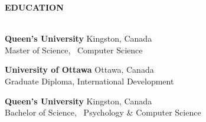 \documentclass[letterpaper]{article}
\newcommand{\lineunder} {
        \vspace*{-8pt} \\
        \hspace*{-18pt} \hrulefill \\
    }
\newcommand{\header} [1] {
        \vspace{9pt}
        {\hspace*{-18pt}\vspace*{6pt} \large \textbf {#1}}
        \vspace*{-6pt} \lineunder
        \vspace{2pt}
    }
\newcommand{\employer}[4]{
        \vspace{3pt}
        \textbf{#1}  %
        \hfill #2\\  %
        \textit{#3}  %
        \hfill #4\\  %
        \vspace{3mm}
    }
\newcommand{\jobintro}[1]{
        #1
        \vspace{5pt}
    }
\newenvironment{jobtasklist}
        {
            \vspace{-12pt}
            \begin{itemize} \itemsep 0pt
        }{
            \end{itemize}
            \vspace{-3pt}
        }
\newcommand{\university}[3]{
        \textbf{#1}  %
        \hfill #2\\  %
        #3\\         %
        \vspace{2mm}
    }
\begin{document}
%
%
%
%
%
%



\header{EDUCATION}
    \university
        {Queen's University}
        {Kingston, Canada}
        {Master of Science, ~Computer Science}

    \university
        {University of Ottawa}
        {Ottawa, Canada}
        {Graduate Diploma, International Development}

    \university
        {Queen's University}
        {Kingston, Canada}
        {Bachelor of Science, ~Psychology \& Computer Science}
\end{document}
